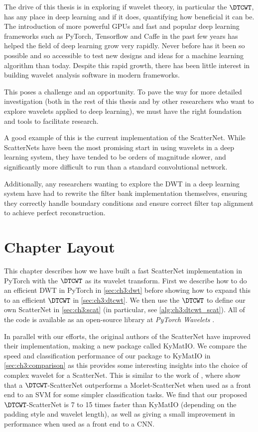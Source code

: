 The drive of this thesis is in exploring if wavelet theory, in
particular the $\DTCWT$, has any place in deep learning and if it does,
quantifying how beneficial it can be. The introduction of more powerful GPUs and
fast and popular deep learning frameworks such as PyTorch, Tensorflow and Caffe
in the past few years has helped the field of deep learning grow very rapidly.
Never before has it been so possible and so accessible to test new designs and
ideas for a machine learning algorithm than today. Despite this rapid growth,
there has been little interest in building wavelet analysis software in modern
frameworks.

This poses a challenge and an opportunity. To pave the way for more detailed
investigation (both in the rest of this thesis and by other researchers
who want to explore wavelets applied to deep learning), we must have the right
foundation and tools to facilitate research.

A good example of this is the current implementation of the ScatterNet. While
ScatterNets have been the most promising start in using wavelets in a deep
learning system, they have tended to be orders of magnitude slower, and significantly more
difficult to run than a standard convolutional network.

Additionally, any researchers wanting to explore the DWT in a deep learning
system have had to rewrite the filter bank implementation themselves, ensuring they
correctly handle boundary conditions and ensure correct filter tap alignment to
achieve perfect reconstruction.

\section{Chapter Layout}
This chapter describes how we have built a fast ScatterNet implementation in
PyTorch with the $\DTCWT$ as its wavelet transform. First we describe how to do an
efficient DWT in PyTorch in \autoref{sec:ch3:dwt} before showing how to expand this
to an efficient $\DTCWT$ in \autoref{sec:ch3:dtcwt}.
We then use the $\DTCWT$ to define our own ScatterNet in \autoref{sec:ch3:scat} (in
particular, see \autoref{alg:ch3:dtcwt_scat}). 
All of the code is available as an open-source library at \emph{PyTorch Wavelets} \cite{cotter_pytorch_2018}.

In parallel with our efforts, the original authors of the ScatterNet have
improved their implementation, making a new package called KyMatIO\cite{andreux_kymatio:_2018}. 
We compare the speed and classification performance of our package to KyMatIO in \autoref{sec:ch3:comparison}
as this provides some interesting insights into the choice of complex wavelet
for a ScatterNet. This is similar to the work of
\cite{singh_multi-resolution_2016}, where
\citeauthor{singh_multi-resolution_2016} show that a $\DTCWT$-ScatterNet
outperforms a Morlet-ScatterNet when used as a front end to an
SVM for some simpler classification tasks.
We find that our proposed $\DTCWT$-ScatterNet is 7 to 15 times faster 
than KyMatIO (depending on the padding style and wavelet length), as well as
giving a small improvement in performance when used as a front end to a CNN.
